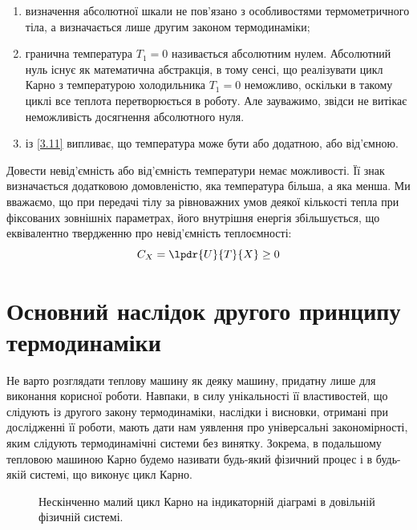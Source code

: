 \begin{enumerate}
	\item [а)] визначення абсолютної шкали не пов'язано з особливостями термометричного тіла, а визначається лише другим законом термодинаміки;
	\item [б)] гранична температура $T_1=0$ називається абсолютним нулем. Абсолютний нуль існує як
	математична абстракція, в тому сенсі, що реалізувати цикл Карно з температурою холодильника
	$T_1=0$ неможливо, оскільки в такому циклі все теплота перетворюється в роботу. Але зауважимо,
	звідси не витікає неможливість досягнення абсолютного нуля.
	\item [в)] із \eqref{3.11} випливає, що температура може бути або додатною, або від'ємною.
\end{enumerate}

Довести невід'ємність або від'ємність температури немає можливості. Її знак визначається додатковою домовленістю, яка температура більша, а яка менша. Ми вважаємо, що при передачі тілу за рівноважних умов деякої кількості тепла при фіксованих зовнішніх параметрах, його внутрішня енергія збільшується, що еквівалентно твердженню про невід'ємність теплоємності:
\begin{equation}\label{3.12}
	C_X =\lpdr{U}{T}{X}\geq 0
\end{equation}

\section[Основний наслідок другого принципу термодинаміки]{Основний наслідок другого принципу
термодинаміки}

Не варто розглядати теплову машину як деяку машину, придатну лише для виконання корисної роботи.
Навпаки, в силу унікальності її властивостей, що слідують із другого закону термодинаміки, наслідки і
висновки, отримані при дослідженні її роботи, мають дати нам уявлення про універсальні закономірності,
яким слідують термодинамічні системи без винятку. Зокрема, в подальшому тепловою машиною Карно будемо
називати будь-який фізичний процес і в будь-якій системі, що виконує цикл Карно.


\begin{figure}[h!]\centering
    
\caption{Нескінченно малий цикл Карно на індикаторній діаграмі в довільній фізичній системі.}
\label{pic:3.4}
\end{figure}

